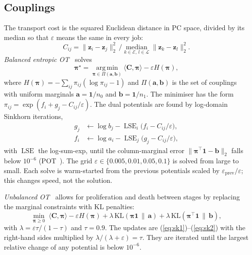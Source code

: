 \documentclass[10pt,journal,compsoc]{IEEEtran}
\begin{document}
\subsection{Couplings}\label{sec:couplings}
The transport cost is the squared Euclidean distance in PC space, divided by its median so
that $\varepsilon$ means the same in every job:
\begin{equation}
C_{ij}=\|\mathbf{z}_i-\mathbf{z}_j\|_2^2\,\big/\operatorname*{median}_{k\in\mathcal{E},\,l\in\mathcal{L}}\|\mathbf{z}_k-\mathbf{z}_l\|_2^2 .
\end{equation}
\emph{Balanced entropic OT}~\cite{Cuturi_2013,Schiebinger_2019} solves
\begin{equation}
\boldsymbol{\pi}^{\star}=\operatorname*{arg\,min}_{\boldsymbol{\pi}\in\Pi(\mathbf{a},\mathbf{b})}
\langle\mathbf{C},\boldsymbol{\pi}\rangle-\varepsilon H(\boldsymbol{\pi}),
\label{eq:ot}
\end{equation}
where $H(\boldsymbol{\pi})=-\sum_{ij}\pi_{ij}(\log\pi_{ij}-1)$ and $\Pi(\mathbf{a},\mathbf{b})$
is the set of couplings with uniform marginals $\mathbf{a}=\mathbf{1}/n_0$ and
$\mathbf{b}=\mathbf{1}/n_1$. The minimiser has the form
$\pi_{ij}=\exp(f_i+g_j-C_{ij}/\varepsilon)$. The dual potentials are found by log-domain
Sinkhorn iterations,
\begin{align}
g_j&\leftarrow\log b_j-\operatorname{LSE}_{i}\bigl(f_i-C_{ij}/\varepsilon\bigr),\label{eq:sk1}\\
f_i&\leftarrow\log a_i-\operatorname{LSE}_{j}\bigl(g_j-C_{ij}/\varepsilon\bigr),\label{eq:sk2}
\end{align}
with $\operatorname{LSE}$ the log-sum-exp, until the column-marginal error
$\|\boldsymbol{\pi}^{\top}\mathbf{1}-\mathbf{b}\|_2$ falls below $10^{-6}$
(POT~\cite{Flamary_2021}). The grid $\varepsilon\in\{0.005,0.01,0.05,0.1\}$ is solved from
large to small. Each solve is warm-started from the previous potentials scaled by
$\varepsilon_{\mathrm{prev}}/\varepsilon$; this changes speed, not the solution.

\emph{Unbalanced OT}~\cite{Chizat_2018} allows for proliferation and death between stages
by replacing the marginal constraints with KL penalties:
\begin{equation}
\min_{\boldsymbol{\pi}\geq 0}\;\langle\mathbf{C},\boldsymbol{\pi}\rangle-\varepsilon H(\boldsymbol{\pi})
+\lambda\,\mathrm{KL}(\boldsymbol{\pi}\mathbf{1}\,\|\,\mathbf{a})
+\lambda\,\mathrm{KL}(\boldsymbol{\pi}^{\top}\mathbf{1}\,\|\,\mathbf{b}),
\end{equation}
with $\lambda=\varepsilon\tau/(1-\tau)$ and $\tau=0.9$. The updates are
(\ref{eq:sk1})--(\ref{eq:sk2}) with the right-hand sides multiplied by
$\lambda/(\lambda+\varepsilon)=\tau$. They are iterated until the largest relative change
of any potential is below $10^{-6}$.
\end{document}
